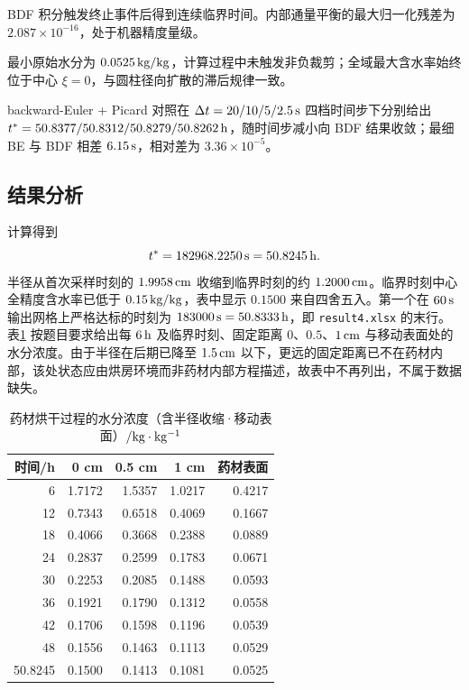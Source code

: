 \documentclass[UTF8,a4paper,12pt]{ctexart}
\begin{document}
BDF 积分触发终止事件后得到连续临界时间。内部通量平衡的最大归一化残差为 $2.087\times10^{-16}$，处于机器精度量级。

最小原始水分为 $0.0525\rm\,kg/kg$，计算过程中未触发非负裁剪；全域最大含水率始终位于中心 $\xi=0$，与圆柱径向扩散的滞后规律一致。

backward-Euler + Picard 对照在 $\Delta t=20/10/5/2.5\rm\,s$ 四档时间步下分别给出 $t^*=50.8377/50.8312/50.8279/50.8262\rm\,h$，随时间步减小向 BDF 结果收敛；最细 BE 与 BDF 相差 $6.15\rm\,s$，相对差为 $3.36\times10^{-5}$。

\subsection{结果分析}
计算得到
\begin{equation}
  t^*=182968.2250\rm\,s=50.8245\rm\,h.
\end{equation}
半径从首次采样时刻的 $1.9958\rm\,cm$ 收缩到临界时刻的约 $1.2000\rm\,cm$。临界时刻中心全精度含水率已低于 $0.15\rm\,kg/kg$，表中显示 $0.1500$ 来自四舍五入。第一个在 $60\rm\,s$ 输出网格上严格达标的时刻为 $183000\rm\,s=50.8333\rm\,h$，即 \texttt{result4.xlsx} 的末行。表\ref{tab:q4-moist} 按题目要求给出每 $6\rm\,h$ 及临界时刻、固定距离 $0$、$0.5$、$1\rm\,cm$ 与移动表面处的水分浓度。由于半径在后期已降至 $1.5\rm\,cm$ 以下，更远的固定距离已不在药材内部，该处状态应由烘房环境而非药材内部方程描述，故表中不再列出，不属于数据缺失。

\begin{table}[H]
  \centering
  \caption{药材烘干过程的水分浓度（含半径收缩·移动表面）$/\rm kg\cdot kg^{-1}$}
  \label{tab:q4-moist}
  \begin{tabular}{rrrrr}
    \toprule
    时间/h & 0 cm & 0.5 cm & 1 cm & 药材表面\\ \midrule
    6 & 1.7172 & 1.5357 & 1.0217 & 0.4217\\
    12 & 0.7343 & 0.6518 & 0.4069 & 0.1667\\
    18 & 0.4066 & 0.3668 & 0.2388 & 0.0889\\
    24 & 0.2837 & 0.2599 & 0.1783 & 0.0671\\
    30 & 0.2253 & 0.2085 & 0.1488 & 0.0593\\
    36 & 0.1921 & 0.1790 & 0.1312 & 0.0558\\
    42 & 0.1706 & 0.1598 & 0.1196 & 0.0539\\
    48 & 0.1556 & 0.1463 & 0.1113 & 0.0529\\
    50.8245 & 0.1500 & 0.1413 & 0.1081 & 0.0525\\
    \bottomrule
  \end{tabular}
\end{table}
\end{document}
